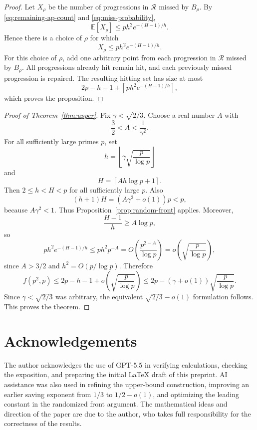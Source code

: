 \documentclass[11pt]{article}
\theoremstyle{remark}
\newcommand{\floor}[1]{\left\lfloor #1\right\rfloor}
\newcommand{\ceil}[1]{\left\lceil #1\right\rceil}
\numberwithin{equation}{section}
\begin{document}
\begin{proof}
Let $X_\rho$ be the number of progressions in $\mathcal R$ missed by $B_\rho$.
By \eqref{eq:remaining-ap-count} and \eqref{eq:miss-probability},
\[
        \mathbb E \left[X_\rho\right]
        \le
        p h^2 e^{-(H-1)/h}.
\]
Hence there is a choice of $\rho$ for which
\[
        X_\rho\le p h^2 e^{-(H-1)/h}.
\]
For this choice of $\rho$, add one arbitrary point from each progression in $\mathcal R$ missed by $B_\rho$.
All progressions already hit remain hit, and each previously missed progression is repaired.
The resulting hitting set has size at most
\[
        2p-h-1+
        \ceil{p h^2 e^{-(H-1)/h}},
\]
which proves the proposition.
\end{proof}

\begin{proof}[Proof of Theorem~\ref{thm:upper}]
Fix $\gamma<\sqrt{2/3}$.
Choose a real number $A$ with
\[
        \frac32<A<\frac1{\gamma^2}.
\]
For all sufficiently large primes $p$, set
\[
        h=\floor{\gamma\sqrt{\frac p{\log p}}}
\]
and
\[
        H=\ceil{Ah\log p+1}.
\]
Then $2\le h<H<p$ for all sufficiently large $p$.
Also
\[
        (h+1)H=(A\gamma^2+o(1))p<p,
\]
because $A\gamma^2<1$.
Thus Proposition~\ref{prop:random-front} applies.
Moreover,
\[
        \frac{H-1}{h}\ge A\log p,
\]
so
\[
        p h^2e^{-(H-1)/h}
        \le
        p h^2 p^{-A}
        =O\!\left(\frac{p^{2-A}}{\log p}\right)
        =o\!\left(\sqrt{\frac p{\log p}}\right),
\]
since $A>3/2$ and $h^2=O(p/\log p)$.
Therefore
\[
        f(p^2,p)
        \le
        2p-h-1+o\!\left(\sqrt{\frac p{\log p}}\right)
        \le
        2p-(\gamma+o(1))\sqrt{\frac p{\log p}}.
\]
Since $\gamma<\sqrt{2/3}$ was arbitrary, the equivalent $\sqrt{2/3}-o(1)$ formulation follows.
This proves the theorem.
\end{proof}

\section*{Acknowledgements}
The author acknowledges the use of GPT-5.5 in verifying calculations, checking the exposition, and preparing the initial \LaTeX{} draft of this preprint. AI assistance was also used in refining the upper-bound construction, improving an earlier saving exponent from \(1/3\) to \(1/2-o(1)\), and optimizing the leading constant in the randomized front argument. The mathematical ideas and direction of the paper are due to the author, who takes full responsibility for the correctness of the results.
\end{document}
